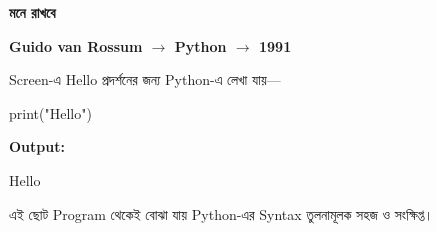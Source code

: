 \begin{rememberbox}

\textbf{\color{deepOrange}মনে রাখবে}

\begin{center}

\textbf{
Guido van Rossum
\(\rightarrow\)
Python
\(\rightarrow\)
1991
}

\end{center}

\end{rememberbox}


Screen-এ \textenglish{\ttfamily Hello} প্রদর্শনের জন্য
Python-এ লেখা যায়—

\begin{codebox}

\begin{center}
{\textenglish{\ttfamily print("Hello")}}
\end{center}

\end{codebox}

\textbf{Output:}

\begin{codebox}

\begin{center}
{\textenglish{\ttfamily Hello}}
\end{center}

\end{codebox}

এই ছোট Program থেকেই বোঝা যায় Python-এর Syntax তুলনামূলক
সহজ ও সংক্ষিপ্ত।


